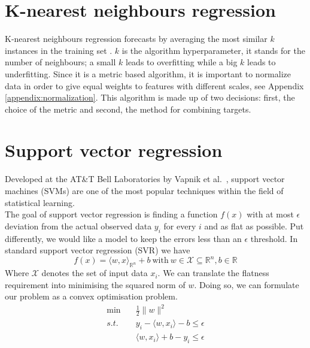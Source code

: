 \section{K-nearest neighbours regression}
K-nearest neighbours regression forecasts by averaging the most similar $k$ instances in the training set \cite{macqueen1967some}. $k$ is the algorithm hyperparameter, it stands for the number of neighbours; a small $k$ leads to overfitting while a big $k$ leads to underfitting. 
Since it is a metric based algorithm, it is important to normalize data in order to give equal weights to features with different scales, see Appendix \ref{appendix:normalization}.
This algorithm is made up of two decisions: first, the choice of the metric and second, the method for combining targets.


\section{Support vector regression}
Developed at the AT\&T Bell Laboratories by Vapnik et al.\ \cite{cortes1995support, vapnik1997support}, support vector machines (SVMs) are one of the most popular techniques within the field of statistical learning.
\\
The goal of support vector regression is finding a function $f(x)$ with at most $\epsilon$ deviation from the actual observed data $y_i$ for every $i$ and as flat as possible. 
Put differently, we would like a model to keep the errors less than an $\epsilon$ threshold.  
In standard support vector regression (SVR) we have
\begin{equation}
    f(x)=\langle w,x \rangle_{\mathbb{R}^n} +b \ \textrm{with} \ w \in \mathcal{X} \subseteq \mathbb{R}^n, b \in \mathbb{R}
\end{equation}
Where $\mathcal{X}$ denotes the set of input data $x_i$.
We can translate the flatness requirement into minimising the squared norm of $w$. Doing so, we can formulate our problem as a convex optimisation problem.
\begin{equation}
    \begin{aligned}
        \min \quad& \frac{1}{2}\|w\|^2
        \\
        s.t. \quad& y_i-\langle w, x_i\rangle-b\leq \epsilon
        \\
        \quad& \langle w, x_i\rangle +b-y_i\leq \epsilon
    \end{aligned}
\end{equation}
